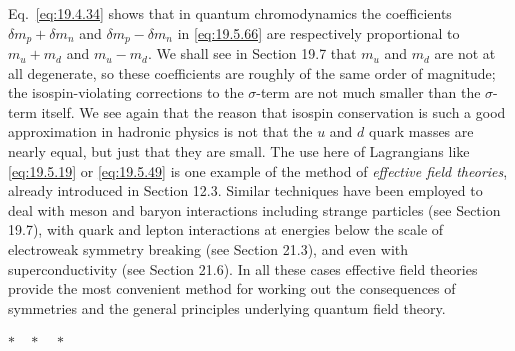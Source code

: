 Eq.~\eqref{eq:19.4.34} shows that in quantum chromodynamics the coefficients $\delta m_p+\delta m_n$ and $\delta m_p-\delta m_n$ in \eqref{eq:19.5.66} are respectively proportional to $m_u+m_d$ and $m_u-m_d$. We shall see in Section 19.7 that $m_u$ and $m_d$ are not at all degenerate, so these coefficients are roughly of the same order of magnitude; the isospin-violating corrections to the $\sigma$-term are not much smaller than the $\sigma$-term itself. We see again that the reason that isospin conservation is such a good approximation in hadronic physics is not that the $u$ and $d$ quark masses are nearly equal, but just that they are small. The use here of Lagrangians like \eqref{eq:19.5.19} or \eqref{eq:19.5.49} is one example of the method of \emph{effective field theories}, already introduced in Section 12.3. Similar techniques have been employed to deal with meson and baryon interactions including strange particles (see Section 19.7), with quark and lepton interactions at energies below the scale of electroweak symmetry breaking (see Section 21.3), and even with superconductivity (see Section 21.6). In all these cases effective field theories provide the most convenient method for working out the consequences of symmetries and the general principles underlying quantum field theory.

\begin{center}
$\ast\quad\ast\quad\ast$
\end{center}

